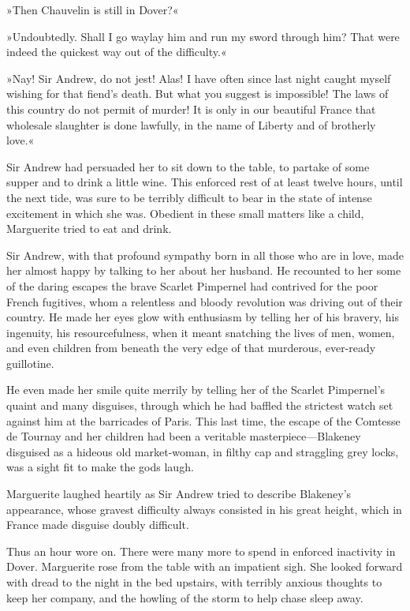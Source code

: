 »Then Chauvelin is still in Dover?«

»Undoubtedly. Shall I go waylay him and run my sword through him? That were indeed the quickest way out of the difficulty.«

»Nay! Sir Andrew, do not jest! Alas! I have often since last night caught myself wishing for that fiend's death. But what you suggest is impossible! The laws of this country do not permit of murder! It is only in our beautiful France that wholesale slaughter is done lawfully, in the name of Liberty and of brotherly love.«

Sir Andrew had persuaded her to sit down to the table, to partake of some supper and to drink a little wine. This enforced rest of at least twelve hours, until the next tide, was sure to be terribly difficult to bear in the state of intense excitement in which she was. Obedient in these small matters like a child, Marguerite tried to eat and drink.

Sir Andrew, with that profound sympathy born in all those who are in love, made her almost happy by talking to her about her husband. He recounted to her some of the daring escapes the brave Scarlet Pimpernel had contrived for the poor French fugitives, whom a relentless and bloody revolution was driving out of their country. He made her eyes glow with enthusiasm by telling her of his bravery, his ingenuity, his resourcefulness, when it meant snatching the lives of men, women, and even children from beneath the very edge of that murderous, ever-ready guillotine.

He even made her smile quite merrily by telling her of the Scarlet Pimpernel's quaint and many disguises, through which he had baffled the strictest watch set against him at the barricades of Paris. This last time, the escape of the Comtesse de Tournay and her children had been a veritable masterpiece—Blakeney disguised as a hideous old market-woman, in filthy cap and straggling grey locks, was a sight fit to make the gods laugh.

Marguerite laughed heartily as Sir Andrew tried to describe Blakeney's appearance, whose gravest difficulty always consisted in his great height, which in France made disguise doubly difficult.

Thus an hour wore on. There were many more to spend in enforced inactivity in Dover. Marguerite rose from the table with an impatient sigh. She looked forward with dread to the night in the bed upstairs, with terribly anxious thoughts to keep her company, and the howling of the storm to help chase sleep away.

